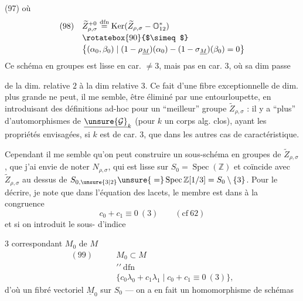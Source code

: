 (97)
où
\[
\begin{aligned}
(98)\quad&\widetilde Z_{\rho,\sigma}^{+0}
\overset{\mathrm{dfn}}=\operatorname{Ker}
(\widetilde Z_{\rho,\sigma}\mathbin{-}\mathbb O_{12}^{*})\\[-2pt]
&\rotatebox{90}{$\simeq$}\\[-2pt]
&\bigl\{(\alpha_0,\beta_0)\mid
(1-\rho_{\underline M})(\alpha_0)-(1-\sigma_{\underline M})(\beta_0)=0\bigr\}
\end{aligned}
\]
Ce schéma en groupes est lisse en car. $\ne3$, mais pas en car. $3$, où sa dim passe

de la dim. relative $2$ à la dim relative $3$.
Ce fait d'une fibre exceptionnelle de dim. plus grande ne peut, il me semble, être
éliminé par une entourloupette,  en introduisant
 des définitions ad-hoc pour un ``meilleur'' groupe
$\widetilde Z_{\rho,\sigma}$ : il y a ``plus'' d'automorphismes de
$\underline{\unsure{\mathcal G}}_k$ (pour $k$ un
corps alg. clos), ayant les propriétés envisagées, si $k$ est de car. $3$, que dans les autres cas de caractéristique.

Cependant il me semble qu'on peut construire un sous-schéma en groupes
 de $\widetilde Z_{\rho,\sigma}$, que j'ai envie de noter
$N_{\rho,\sigma}$, qui est lisse sur $S_0=\operatorname{Spec}(\mathbb Z)$ et
coïncide avec $\widetilde Z_{\rho,\sigma}$ au dessus de
$S_{0,\unsure{3|2}}\unsure{{}=}\operatorname{Spec}\mathbb Z[1/3]=S_0\setminus\{3\}$.
Pour le décrire, je note que dans l'équation des lacets,
le  membre est
 dans
à la congruence
\[
c_0+c_1\equiv0\ (3)\qquad(\mathrm{cf}\ 62)
\]
et si on introduit le sous- d'indice

$3$ correspondant $M_0$ de $M$
\[
\begin{aligned}
(99)\qquad&M_0\subset M\\[-2pt]
&\prime\prime\ \mathrm{dfn}\\[-2pt]
&\{c_0\lambda_0+c_1\lambda_1\mid c_0+c_1\equiv0\ (3)\},
\end{aligned}
\]
d'où un fibré vectoriel $\underline M_0$ sur $S_0$ ---
on a en fait un homomorphisme de schémas

